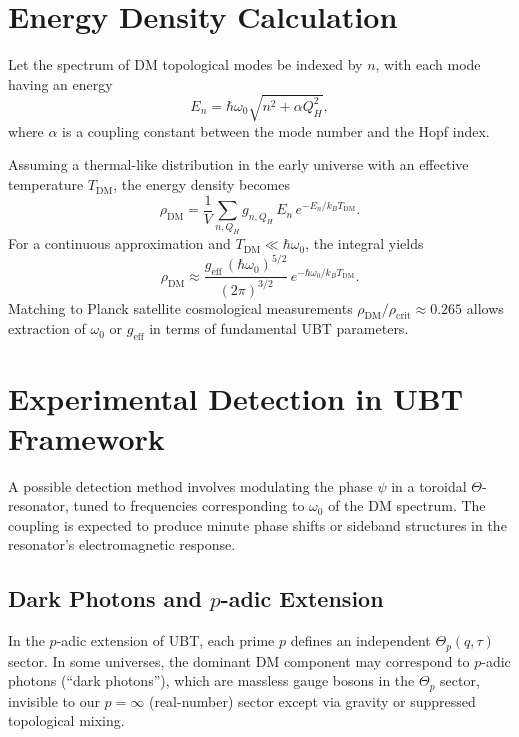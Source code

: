 \documentclass[12pt,a4paper]{article}
\begin{document}
\section{Energy Density Calculation}
Let the spectrum of DM topological modes be indexed by $n$, with each mode having an energy
\begin{equation}
E_n = \hbar \omega_0 \sqrt{n^2 + \alpha Q_H^2},
\end{equation}
where $\alpha$ is a coupling constant between the mode number and the Hopf index.

Assuming a thermal-like distribution in the early universe with an effective temperature $T_{\mathrm{DM}}$, the energy density becomes
\begin{equation}
\rho_{\mathrm{DM}} = \frac{1}{V} \sum_{n,Q_H} g_{n,Q_H} \, E_n \, e^{-E_n/k_B T_{\mathrm{DM}}}.
\end{equation}
For a continuous approximation and $T_{\mathrm{DM}} \ll \hbar\omega_0$, the integral yields
\begin{equation}
\rho_{\mathrm{DM}} \approx \frac{g_{\mathrm{eff}} \, (\hbar\omega_0)^{5/2}}{(2\pi)^{3/2}} \, e^{-\hbar\omega_0/k_B T_{\mathrm{DM}}}.
\end{equation}
Matching to Planck satellite cosmological measurements $\rho_{\mathrm{DM}}/\rho_{\mathrm{crit}} \approx 0.265$ allows extraction of $\omega_0$ or $g_{\mathrm{eff}}$ in terms of fundamental UBT parameters.

\section{Experimental Detection in UBT Framework}
A possible detection method involves modulating the phase $\psi$ in a toroidal $\Theta$-resonator, tuned to frequencies corresponding to $\omega_0$ of the DM spectrum. The coupling is expected to produce minute phase shifts or sideband structures in the resonator's electromagnetic response.

\subsection{Dark Photons and $p$-adic Extension}
In the $p$-adic extension of UBT, each prime $p$ defines an independent $\Theta_p(q,\tau)$ sector. In some universes, the dominant DM component may correspond to $p$-adic photons (``dark photons''), which are massless gauge bosons in the $\Theta_p$ sector, invisible to our $p= \infty$ (real-number) sector except via gravity or suppressed topological mixing.
\end{document}
